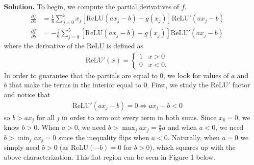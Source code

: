 \documentclass{letter}
\newcommand{\Solution}[1]{%
	\textbf{Solution.} #1 \par%
}
\newcommand{\relu}{\mathrm{ReLU}}
\begin{document}
    \Solution{To begin, we compute the partial derivatives of $f$. \begin{align*}
        \frac{\partial f}{\partial a} &= \frac{1}{6}\sum_{j = 0}^5 x_j[\relu(ax_j - b) - g(x_j)]\relu'(ax_j - b) \\
        \frac{\partial f}{\partial b} &= -\frac{1}{6}\sum_{j = 0}^5 [\relu(ax_j - b) - g(x_j)]\relu'(ax_j - b)
    \end{align*} where the derivative of the $\relu$ is defined as \begin{align*}
        \relu'(x) = \begin{cases} 1 & x > 0 \\ 0 & x < 0. \end{cases}
    \end{align*} In order to guarantee that the partials are equal to 0, we look for values of $a$ and $b$ that make the terms in the interior equal to 0. First, we study the $\relu'$ factor and notice that \begin{align*}
        \relu'(ax_j - b) = 0 \iff ax_j - b < 0
    \end{align*} so $b > ax_j$ for all $j$ in order to zero out every term in both sums. Since $x_0 = 0$, we know $b > 0$. When $a > 0$, we need $b > \max_j ax_j = \frac{\pi}{2}a$ and when $a < 0$, we need $b > \min_j ax_j = 0$ since the inequality flips when $a < 0$. Naturally, when $a = 0$ we simply need $b > 0$ (as $\relu(-b) = 0$ for $b > 0$), which squares up with the above characterization. This flat region can be seen in Figure 1 below. 
    
}
\end{document}
